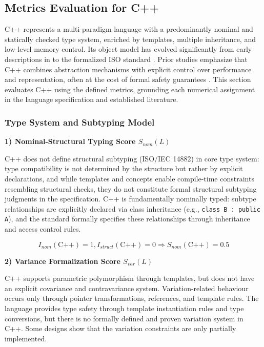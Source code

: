
\subsection{Metrics Evaluation for C++}

C++ represents a multi-paradigm language with a predominantly nominal and statically checked type system, enriched by templates, multiple inheritance, and low-level memory control. Its object model has evolved significantly from early descriptions in \cite{stroustrup1994design} to the formalized ISO standard \cite{cpp2017iso}. Prior studies emphasize that C++ combines abstraction mechanisms with explicit control over performance and representation, often at the cost of formal safety guarantees \cite{abrahams2004c++}. This section evaluates C++ using the defined metrics, grounding each numerical assignment in the language specification and established literature.

\subsubsection{Type System and Subtyping Model}


\textbf{1) Nominal-Structural Typing Score $S_{nom}(L)$}

C++ does not define structural subtyping\cite{stroustrup1994design} (ISO/IEC 14882) in core type system: type compatibility is not determined by the structure but rather by explicit declarations, and while templates and concepts enable compile-time constraints resembling structural checks, they do not constitute formal structural subtyping judgments in the specification. 
C++ is fundamentally nominally typed: subtype relationships are explicitly declared via class inheritance (e.g., \texttt{class B : public A}), and the standard formally specifies these relationships through inheritance and access control rules. 

\[
    I_{nom}(\text{C++}) = 1, I_{struct}(\text{C++}) = 0 \Rightarrow S_{nom}(\text{C++}) = 0.5
\]

\textbf{2) Variance Formalization Score $S_{var}(L)$}

C++ supports parametric polymorphism through templates, but does not have an explicit covariance and contravariance system. Variation-related behaviour occurs only through pointer transformations, references, and template rules. The language provides type safety through template instantiation rules and type conversions, but there is no formally defined and proven variation system in C++. Some designs show that the variation constraints are only partially implemented.

